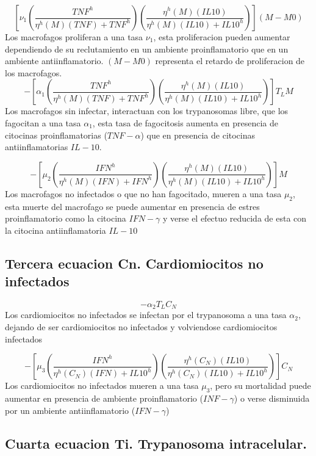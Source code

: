 \documentclass[
]{article}
\begin{document}
\[ [\nu_{1}(\dfrac{TNF^{h}}{\eta^{h}(M)(TNF)+TNF^{h}})(\dfrac{\eta^{h}(M)(IL10)}{\eta^{h}(M)(IL10)+IL10^{h}})](M-M0)\]
Los macrofagos proliferan a una tasa \(\nu_{1}\), esta proliferacion
pueden aumentar dependiendo de su reclutamiento en un ambiente
proinflamatorio que en un ambiente antiinflamatorio. \((M-M0)\)
representa el retardo de proliferacion de los macrofagos.
\[-[\alpha_{1}(\dfrac{TNF^{h}}{\eta^{h}(M)(TNF)+ TNF^{h}})(\dfrac{\eta^{h}(M)(IL10)}{\eta^{h}(M)(IL10)+IL10^{h}})]T_{L}M\]
Los macrofagos sin infectar, interactuan con los trypanosomas libre, que
los fagocitan a una tasa \(\alpha_{1}\), esta tasa de fagocitosis
aumenta en presencia de citocinas proinflamatorias (\(TNF-\alpha\)) que
en presencia de citocinas antiinflamatorias \(IL-10\).

\[-[\mu_{2}(\dfrac{IFN^{h}}{\eta^{h}(M)(IFN)+IFN^{h}})(\dfrac{\eta^{h}(M)(IL10)}{\eta^{h}(M)(IL10)+IL10^{h}})]M\]
Los macrofagos no infectados o que no han fagocitado, mueren a una tasa
\(\mu_{2}\), esta muerte del macrofago se puede aumentar en presencia de
estres proinflamatorio como la citocina \(IFN-\gamma\) y verse el
efectuo reducida de esta con la citocina antiinflamatoria \(IL-10\)

\hypertarget{tercera-ecuacion-cn.-cardiomiocitos-no-infectados}{%
\subsection{Tercera ecuacion Cn. Cardiomiocitos no
infectados}\label{tercera-ecuacion-cn.-cardiomiocitos-no-infectados}}

\[-\alpha_{2}T_{L}C_{N}\] Los cardiomiocitos no infectados se infectan
por el trypanosoma a una tasa \(\alpha_{2}\), dejando de ser
cardiomiocitos no infectados y volviendose cardiomiocitos infectados

\[-[\mu_{3}(\dfrac{IFN^{h}}{\eta^{h}(C_{N})(IFN)+IL10^{h}})(\dfrac{\eta^{h}(C_{N})(IL10)}{\eta^{h}(C_{N})(IL10)+IL10^{h}})]C_{N} \]
Los cardiomiocitos no infectados mueren a una tasa \(\mu_{3}\), pero su
mortalidad puede aumentar en presencia de ambiente proinflamatorio
(\(INF-\gamma\)) o verse disminuida por un ambiente antiinflamatorio
(\(IFN-\gamma\))

\hypertarget{cuarta-ecuacion-ti.-trypanosoma-intracelular.}{%
\subsection{Cuarta ecuacion Ti. Trypanosoma
intracelular.}\label{cuarta-ecuacion-ti.-trypanosoma-intracelular.}}
\end{document}
